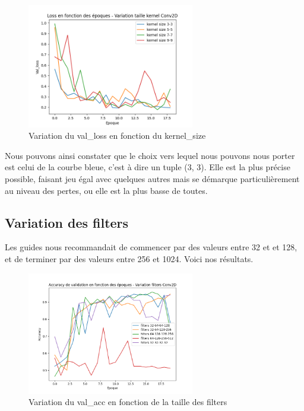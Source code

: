 \documentclass{rapport}
\begin{document}
        \begin{figure}[H]
            \centering
            \includegraphics[width=0.65\textwidth]{rapport/plots/kernel_loss.png}
            \caption{Variation du val\_loss en fonction du kernel\_size}
            \label{fig:mesh2}
        \end{figure}
        
        Nous pouvons ainsi constater que le choix vers lequel nous pouvons nous porter est celui de la courbe bleue, c'est à dire un tuple (3, 3). Elle est la plus précise possible, faisant jeu égal avec quelques autres mais se démarque particulièrement au niveau des pertes, ou elle est la plus basse de toutes.
        
        \newpage
        \subsection{Variation des filters}
        Les guides nous recommandait de commencer par des valeurs entre 32 et et 128, et de terminer par des valeurs entre 256 et 1024. Voici nos résultats.
        
        \begin{figure}[H]
            \centering
            \includegraphics[width=0.65\textwidth]{rapport/plots/filters_acc.png}
            \caption{Variation du val\_acc en fonction de la taille des filters}
            \label{fig:mesh1}
        \end{figure}
\end{document}
